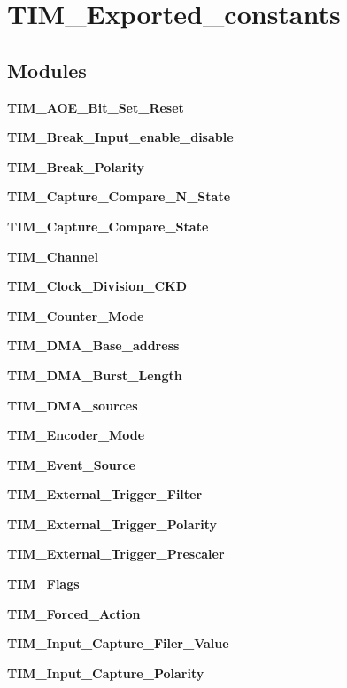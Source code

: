 \section{T\+I\+M\+\_\+\+Exported\+\_\+constants}
\label{group__TIM__Exported__constants}
\subsection*{Modules}
\begin{DoxyCompactItemize}
\item 
\textbf{ T\+I\+M\+\_\+\+A\+O\+E\+\_\+\+Bit\+\_\+\+Set\+\_\+\+Reset}
\item 
\textbf{ T\+I\+M\+\_\+\+Break\+\_\+\+Input\+\_\+enable\+\_\+disable}
\item 
\textbf{ T\+I\+M\+\_\+\+Break\+\_\+\+Polarity}
\item 
\textbf{ T\+I\+M\+\_\+\+Capture\+\_\+\+Compare\+\_\+\+N\+\_\+\+State}
\item 
\textbf{ T\+I\+M\+\_\+\+Capture\+\_\+\+Compare\+\_\+\+State}
\item 
\textbf{ T\+I\+M\+\_\+\+Channel}
\item 
\textbf{ T\+I\+M\+\_\+\+Clock\+\_\+\+Division\+\_\+\+C\+KD}
\item 
\textbf{ T\+I\+M\+\_\+\+Counter\+\_\+\+Mode}
\item 
\textbf{ T\+I\+M\+\_\+\+D\+M\+A\+\_\+\+Base\+\_\+address}
\item 
\textbf{ T\+I\+M\+\_\+\+D\+M\+A\+\_\+\+Burst\+\_\+\+Length}
\item 
\textbf{ T\+I\+M\+\_\+\+D\+M\+A\+\_\+sources}
\item 
\textbf{ T\+I\+M\+\_\+\+Encoder\+\_\+\+Mode}
\item 
\textbf{ T\+I\+M\+\_\+\+Event\+\_\+\+Source}
\item 
\textbf{ T\+I\+M\+\_\+\+External\+\_\+\+Trigger\+\_\+\+Filter}
\item 
\textbf{ T\+I\+M\+\_\+\+External\+\_\+\+Trigger\+\_\+\+Polarity}
\item 
\textbf{ T\+I\+M\+\_\+\+External\+\_\+\+Trigger\+\_\+\+Prescaler}
\item 
\textbf{ T\+I\+M\+\_\+\+Flags}
\item 
\textbf{ T\+I\+M\+\_\+\+Forced\+\_\+\+Action}
\item 
\textbf{ T\+I\+M\+\_\+\+Input\+\_\+\+Capture\+\_\+\+Filer\+\_\+\+Value}
\item 
\textbf{ T\+I\+M\+\_\+\+Input\+\_\+\+Capture\+\_\+\+Polarity}

\end{DoxyCompactItemize}
